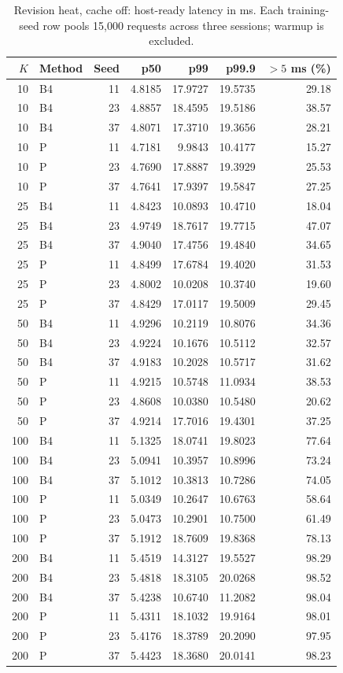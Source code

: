 \begin{table}[ht]
\centering\small
\caption{Revision heat, cache off: host-ready latency in ms. Each training-seed row pools 15,000 requests across three sessions; warmup is excluded.}\label{tab:e2_seed_heat_off}
\begin{tabular}{@{}rlrrrrr@{}}\toprule
$K$ & Method & Seed & p50 & p99 & p99.9 & $>5$ ms (\%)\\\midrule
10 & B4 & 11 & 4.8185 & 17.9727 & 19.5735 & 29.18\\
10 & B4 & 23 & 4.8857 & 18.4595 & 19.5186 & 38.57\\
10 & B4 & 37 & 4.8071 & 17.3710 & 19.3656 & 28.21\\
10 & P & 11 & 4.7181 & 9.9843 & 10.4177 & 15.27\\
10 & P & 23 & 4.7690 & 17.8887 & 19.3929 & 25.53\\
10 & P & 37 & 4.7641 & 17.9397 & 19.5847 & 27.25\\
25 & B4 & 11 & 4.8423 & 10.0893 & 10.4710 & 18.04\\
25 & B4 & 23 & 4.9749 & 18.7617 & 19.7715 & 47.07\\
25 & B4 & 37 & 4.9040 & 17.4756 & 19.4840 & 34.65\\
25 & P & 11 & 4.8499 & 17.6784 & 19.4020 & 31.53\\
25 & P & 23 & 4.8002 & 10.0208 & 10.3740 & 19.60\\
25 & P & 37 & 4.8429 & 17.0117 & 19.5009 & 29.45\\
50 & B4 & 11 & 4.9296 & 10.2119 & 10.8076 & 34.36\\
50 & B4 & 23 & 4.9224 & 10.1676 & 10.5112 & 32.57\\
50 & B4 & 37 & 4.9183 & 10.2028 & 10.5717 & 31.62\\
50 & P & 11 & 4.9215 & 10.5748 & 11.0934 & 38.53\\
50 & P & 23 & 4.8608 & 10.0380 & 10.5480 & 20.62\\
50 & P & 37 & 4.9214 & 17.7016 & 19.4301 & 37.25\\
100 & B4 & 11 & 5.1325 & 18.0741 & 19.8023 & 77.64\\
100 & B4 & 23 & 5.0941 & 10.3957 & 10.8996 & 73.24\\
100 & B4 & 37 & 5.1012 & 10.3813 & 10.7286 & 74.05\\
100 & P & 11 & 5.0349 & 10.2647 & 10.6763 & 58.64\\
100 & P & 23 & 5.0473 & 10.2901 & 10.7500 & 61.49\\
100 & P & 37 & 5.1912 & 18.7609 & 19.8368 & 78.13\\
200 & B4 & 11 & 5.4519 & 14.3127 & 19.5527 & 98.29\\
200 & B4 & 23 & 5.4818 & 18.3105 & 20.0268 & 98.52\\
200 & B4 & 37 & 5.4238 & 10.6740 & 11.2082 & 98.04\\
200 & P & 11 & 5.4311 & 18.1032 & 19.9164 & 98.01\\
200 & P & 23 & 5.4176 & 18.3789 & 20.2090 & 97.95\\
200 & P & 37 & 5.4423 & 18.3680 & 20.0141 & 98.23\\
\bottomrule\end{tabular}
\end{table}

